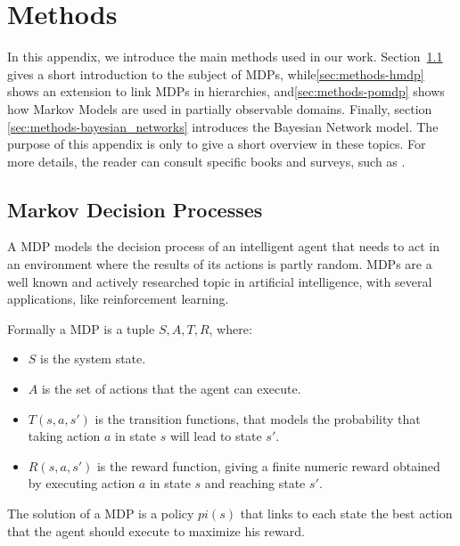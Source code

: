 
\chapter{Methods} %

\label{appendix-methods} %


In this appendix, we introduce the main methods used in our work. Section~\ref{sec:methods-mdp} gives a short introduction to the subject of MDPs, while\ref{sec:methods-hmdp} shows an extension to link MDPs in hierarchies, and\ref{sec:methods-pomdp} shows how Markov Models are used in partially observable domains. Finally, section \ref{sec:methods-bayesian_networks} introduces the Bayesian Network model. The purpose of this appendix is only to give a short overview in these topics. For more details, the reader can consult specific books and surveys, such as \cite{2012Mausam}.
  
\section{Markov Decision Processes}
\label{sec:methods-mdp}
A MDP models the decision process of an intelligent agent that needs to act in an environment where the results of its actions is partly random. MDPs are a well known and actively researched topic in artificial intelligence, with several applications, like reinforcement learning.

Formally a MDP is a tuple $S,A,T,R$, where: 
\begin{itemize}
\item $S$ is the system state.
\item $A$ is the set of actions that the agent can execute.
\item $T(s,a,s')$ is the transition functions, that models the probability that taking action $a$ in state $s$ will lead to state $s'$.
\item $R(s,a,s')$ is the reward function, giving a finite numeric reward obtained by executing action $a$ in state $s$ and reaching state $s'$.
\end{itemize}

The solution of a MDP is a policy $pi(s)$ that links to each state the best action that the agent should execute to maximize his reward.

